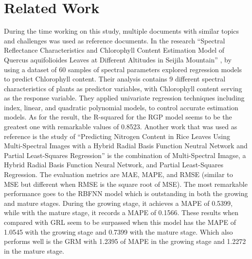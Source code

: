 \section{Related Work}
During the time working on this study, multiple documents with similar topics and challenges was used as reference documents. In the research “Spectral Reflectance Characteristics and Chlorophyll Content Estimation Model of Quercus aquifolioides Leaves at Different Altitudes in Seijila Mountain” \cite{zhu2020spectral}, by using a dataset of 60 samples  of spectral parameters explored regression models to predict Chlorophyll content. Their analysis contains 9 different spectral characteristics of plants as predictor variables, with Chlorophyll content serving as the response variable. They applied univariate regression techniques including index, linear, and quadratic polynomial models, to control accurate estimation models. As for the result, the R-squared for the RGP model seems to be the greatest one with remarkable values of 0.8523.
Another work that was used as reference is the study of “Predicting Nitrogen Content in Rice Leaves Using Multi-Spectral Images with a Hybrid Radial Basis Function Neutral Network and Partial Least-Squares Regression” \cite{yu2018development} is the combination of Multi-Spectral Imagse, a Hybrid Radial Basis Function Neural Network, and Partial Least-Squares Regression. The evaluation metrics are MAE, MAPE, and RMSE (similar to MSE but different when RMSE is the square root of MSE). The most remarkable performance goes to the RBFNN model which is outstanding in both the growing and mature stages. During the growing stage, it achieves a MAPE of 0.5399, while with the mature stage, it records a MAPE of 0.1566. These results when compared with GRL seem to be surpassed when this model has the MAPE of 1.0545 with the growing stage and 0.7399 with the mature stage. Which also performs well is the GRM with 1.2395 of MAPE in the growing stage and 1.2272 in the mature stage. 
